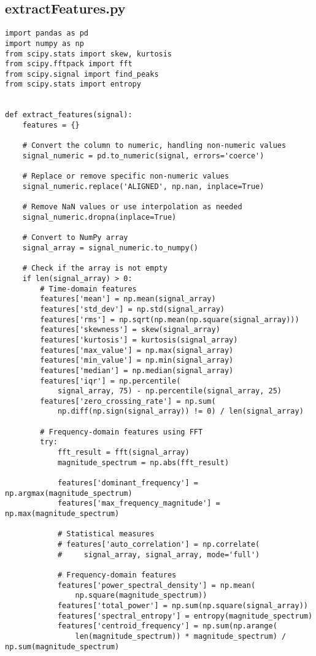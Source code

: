 \subsection{extractFeatures.py}
\begin{lstlisting}[style=pystyle]
import pandas as pd
import numpy as np
from scipy.stats import skew, kurtosis
from scipy.fftpack import fft
from scipy.signal import find_peaks
from scipy.stats import entropy


def extract_features(signal):
    features = {}

    # Convert the column to numeric, handling non-numeric values
    signal_numeric = pd.to_numeric(signal, errors='coerce')

    # Replace or remove specific non-numeric values
    signal_numeric.replace('ALIGNED', np.nan, inplace=True)

    # Remove NaN values or use interpolation as needed
    signal_numeric.dropna(inplace=True)

    # Convert to NumPy array
    signal_array = signal_numeric.to_numpy()

    # Check if the array is not empty
    if len(signal_array) > 0:
        # Time-domain features
        features['mean'] = np.mean(signal_array)
        features['std_dev'] = np.std(signal_array)
        features['rms'] = np.sqrt(np.mean(np.square(signal_array)))
        features['skewness'] = skew(signal_array)
        features['kurtosis'] = kurtosis(signal_array)
        features['max_value'] = np.max(signal_array)
        features['min_value'] = np.min(signal_array)
        features['median'] = np.median(signal_array)
        features['iqr'] = np.percentile(
            signal_array, 75) - np.percentile(signal_array, 25)
        features['zero_crossing_rate'] = np.sum(
            np.diff(np.sign(signal_array)) != 0) / len(signal_array)

        # Frequency-domain features using FFT
        try:
            fft_result = fft(signal_array)
            magnitude_spectrum = np.abs(fft_result)

            features['dominant_frequency'] = np.argmax(magnitude_spectrum)
            features['max_frequency_magnitude'] = np.max(magnitude_spectrum)

            # Statistical measures
            # features['auto_correlation'] = np.correlate(
            #     signal_array, signal_array, mode='full')

            # Frequency-domain features
            features['power_spectral_density'] = np.mean(
                np.square(magnitude_spectrum))
            features['total_power'] = np.sum(np.square(signal_array))
            features['spectral_entropy'] = entropy(magnitude_spectrum)
            features['centroid_frequency'] = np.sum(np.arange(
                len(magnitude_spectrum)) * magnitude_spectrum) / np.sum(magnitude_spectrum)


\end{lstlisting}

